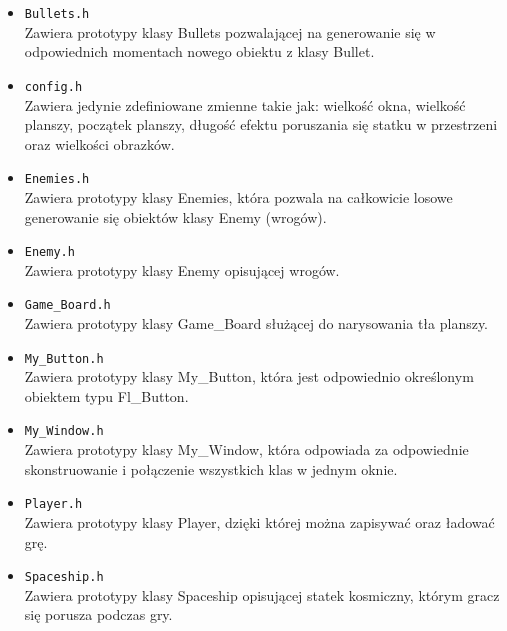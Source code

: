 \documentclass{article}
\begin{document}
\begin{normalsize}
\begin{enumerate}
\begin{itemize}
				\item \verb;Bullets.h;\\
				Zawiera prototypy klasy Bullets pozwalającej na generowanie się w odpowiednich momentach nowego obiektu z klasy Bullet.
				
				\item \verb;config.h;\\
				Zawiera jedynie zdefiniowane zmienne takie jak: wielkość okna, wielkość planszy, początek planszy, długość efektu poruszania się statku w przestrzeni oraz wielkości obrazków.
				\item \verb;Enemies.h;\\
				Zawiera prototypy klasy Enemies, która pozwala na całkowicie losowe generowanie się obiektów klasy Enemy (wrogów).
				\item \verb;Enemy.h;\\
				Zawiera prototypy klasy Enemy opisującej wrogów.
				\item \verb;Game_Board.h;\\
				Zawiera prototypy klasy Game\_Board służącej do narysowania tła planszy.
				\item \verb;My_Button.h;\\
				Zawiera prototypy klasy My\_Button, która jest odpowiednio określonym obiektem typu Fl\_Button.
				\item \verb;My_Window.h;\\
				Zawiera prototypy klasy My\_Window, która odpowiada za odpowiednie skonstruowanie i połączenie wszystkich klas w jednym oknie.
				\item \verb;Player.h;\\
				Zawiera prototypy klasy Player, dzięki której można zapisywać oraz ładować grę.
				\item \verb;Spaceship.h;\\
				Zawiera prototypy klasy Spaceship opisującej statek kosmiczny, którym gracz się porusza podczas gry.
								

\end{itemize}
\end{enumerate}
\end{normalsize}
\end{document}
